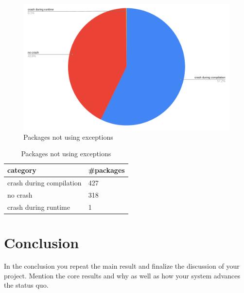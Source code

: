 \documentclass[a4paper,11pt,oneside]{report}
\begin{document}
\newpage
\begin{figure}[h]
    \centering
    \includegraphics[width=15cm]{no_exception.png} 
    \caption{Packages not using exceptions}
    \label{fig:no_exception}
\end{figure}

\begin{table}[h]
    \centering
    \begin{tabular}{ll} 
        \hline
        category                & \#packages  \\ 
        \hline
        crash during compilation & 427         \\
        no crash                 & 318         \\
        crash during runtime     & 1           \\
        \hline
    \end{tabular}
    \caption{Packages not using exceptions}
\end{table}


%



\chapter{Conclusion}

In the conclusion you repeat the main result and finalize the discussion of
your project. Mention the core results and why as well as how your system
advances the status quo.
\end{document}
